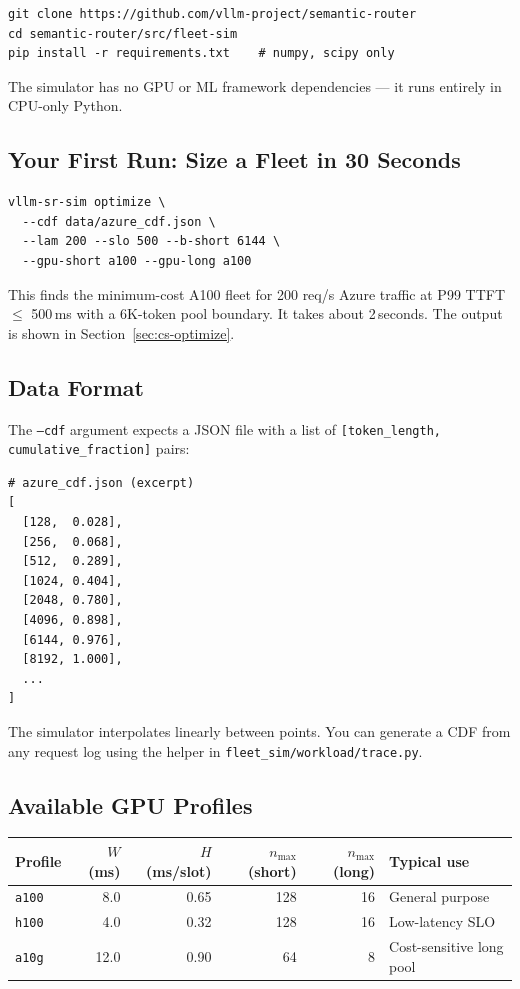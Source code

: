 \documentclass[11pt,a4paper]{article}
\begin{document}
\begin{lstlisting}[style=shell]
git clone https://github.com/vllm-project/semantic-router
cd semantic-router/src/fleet-sim
pip install -r requirements.txt    # numpy, scipy only
\end{lstlisting}

The simulator has no GPU or ML framework dependencies --- it runs
entirely in CPU-only Python.

\subsection{Your First Run: Size a Fleet in 30 Seconds}

\begin{lstlisting}[style=shell]
vllm-sr-sim optimize \
  --cdf data/azure_cdf.json \
  --lam 200 --slo 500 --b-short 6144 \
  --gpu-short a100 --gpu-long a100
\end{lstlisting}

This finds the minimum-cost A100 fleet for 200 req/s Azure traffic
at P99 TTFT $\leq$ 500\,ms with a 6K-token pool boundary.
It takes about 2\,seconds.  The output is shown in
Section~\ref{sec:cs-optimize}.

\subsection{Data Format}

The \texttt{--cdf} argument expects a JSON file with a list of
\texttt{[token\_length, cumulative\_fraction]} pairs:

\begin{lstlisting}[style=python]
# azure_cdf.json (excerpt)
[
  [128,  0.028],
  [256,  0.068],
  [512,  0.289],
  [1024, 0.404],
  [2048, 0.780],
  [4096, 0.898],
  [6144, 0.976],
  [8192, 1.000],
  ...
]
\end{lstlisting}

The simulator interpolates linearly between points.  You can generate
a CDF from any request log using the helper in
\texttt{fleet\_sim/workload/trace.py}.

\subsection{Available GPU Profiles}

\begin{center}
\begin{tabular}{lrrrrl}
\toprule
Profile & $W$ (ms) & $H$ (ms/slot) & $n_{\max}$ (short) & $n_{\max}$ (long)
  & Typical use \\
\midrule
\texttt{a100} & 8.0 & 0.65 & 128 & 16 & General purpose \\
\texttt{h100} & 4.0 & 0.32 & 128 & 16 & Low-latency SLO \\
\texttt{a10g} & 12.0 & 0.90 & 64  & 8  & Cost-sensitive long pool \\
\bottomrule
\end{tabular}
\end{center}
\end{document}

